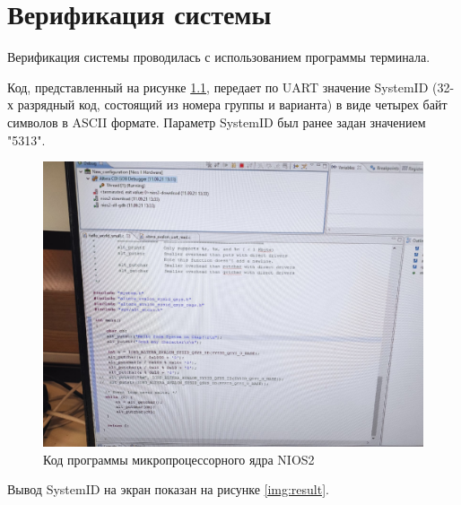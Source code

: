 \chapter{Верификация системы}

Верификация системы проводилась с использованием программы терминала.

Код, представленный на рисунке \ref{img:code},  передает по UART значение SystemID (32-х разрядный код, состоящий из номера группы и варианта) в виде четырех байт символов в ASCII формате. Параметр SystemID был ранее задан значением "5313".

\begin{figure}[H]
	\begin{center}
		\includegraphics[scale=0.3]{img/code.jpg}
	\end{center}
	\captionsetup{justification=centering}
	\caption{Код программы микропроцессорного ядра NIOS2}
	\label{img:code}
\end{figure}

Вывод SystemID на экран показан на рисунке \ref{img:result}.

